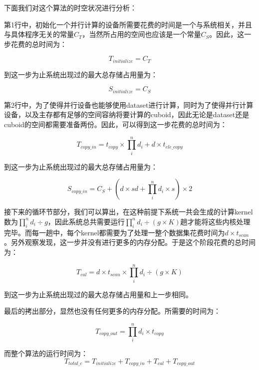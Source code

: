 下面我们对这个算法的时空状况进行分析：

第1行中，初始化一个并行计算的设备所需要花费的时间是一个与系统相关，并且与具体程序无关的常量$C_T$，当然所占用的空间也应该是一个常量$C_S$。因此，这一步花费的总时间为：

\begin{equation}
T_{initialize} = C_T
\end{equation}

到这一步为止系统出现过的最大总存储占用量为：

\begin{equation}
S_{initialize} = C_S
\end{equation}

第2行中，为了使得并行设备也能够使用dataset进行计算，同时为了使得并行计算设备，以及主存都有足够的空间容纳将要计算的cuboid，因此无论是dataset还是cuboid的空间都需要准备两份。因此，可以得到这一步花费的总时间为：

\begin{equation}
T_{copy\_in} = t_{copy} \times \prod_{i}^{n} d_i + d \times t_{ele\_copy}
\end{equation}

到这一步为止系统出现过的最大总存储占用量为：

\begin{equation}
S_{copy\_in} = C_S + (d \times sd + \prod_{i}^{n} d_i \times s) \times 2
\end{equation}

接下来的循环节部分，我们可以算出，在这种前提下系统一共会生成的计算kernel数为$\prod_{i}^{n} d_i \div g$，因此系统总共需要运行$\prod_{i}^{n} d_i \div (g \times K)$趟才能将这些内核处理完毕。而每一趟中，每个kernel都需要为了处理一整个数据集花费时间为$d \times t_{scan}$。另外观察发现，这一步并没有进行更多的内存分配。于是这个阶段花费的总时间为：

\begin{equation}
T_{cal} = d \times t_{scan} \times \prod_{i}^{n} d_i \div (g \times K)
\end{equation}

到这一步为止系统出现过的最大总存储占用量和上一步相同。

最后的拷出部分，显然也没有任何更多的内存分配。所需要的时间为：

\begin{equation}
T_{copy\_out} = \prod_{i}^{n} d_i \times t_{copy}
\end{equation}

而整个算法的运行时间为：
\begin{equation}
T_{total\_c} = 
T_{initialize} + T_{copy\_in} + T_{cal} + T_{copy\_out}
\end{equation}

